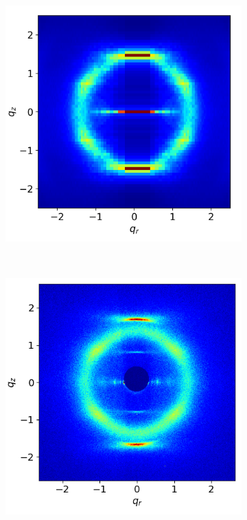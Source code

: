 \documentclass{article}
\begin{document}
  \begin{figure}
  \begin{subfigure}{0.3\linewidth}
        \centering
        \vspace{-0.2em}
        \includegraphics[width=1.018\linewidth]{layered_rzplot.png}
        \caption{}~\label{fig:rz_layered}
  \end{subfigure}
  \begin{subfigure}{0.3\linewidth}
        \centering
        \includegraphics[scale=0.29]{WAXS_raw.png}

\end{subfigure}
\end{figure}
\end{document}
